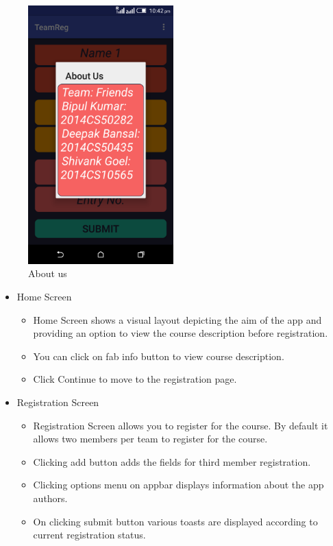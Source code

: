 \documentclass[12pt]{article}
\begin{document}
\begin{center}
\begin{figure}[!ht]
	\centering
	\includegraphics[width=0.5\textwidth]{7.png}
	\caption{About us}
\end{figure}

\end{center}


\begin{itemize}
\item Home Screen
	\begin{itemize}
	\item Home Screen shows a visual layout depicting the aim of the app and providing an option to view the course description before registration.
	\item You can click on fab\cite{android_fab_tutorial} info button to view course description. 
	\item Click Continue to move to the registration page.
	\end{itemize}
\item Registration Screen
	\begin{itemize}
		\item Registration Screen allows you to register for the course. By default it allows two members per team to register for the course.
		\item Clicking add button adds the fields for third member registration.\cite{android_snack_tutorial}
		\item Clicking options menu on appbar displays information about the app authors.\cite{android_diag_tutorial} 
		\item On clicking submit button various toasts are displayed according to current registration status.
	\end{itemize}
\end{itemize}
\end{document}
